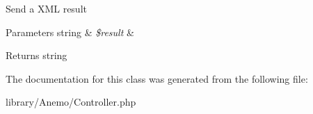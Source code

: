 \label{class_anemo_1_1_controller_a506eee4f1f61534baae414a0a5319665}
Send a XML result 
\begin{DoxyParams}[1]{Parameters}
string & {\em \$result} & \\
\hline
\end{DoxyParams}
\begin{DoxyReturn}{Returns}
string 
\end{DoxyReturn}


The documentation for this class was generated from the following file:\begin{DoxyCompactItemize}
\item 
library/Anemo/Controller.php\end{DoxyCompactItemize}
